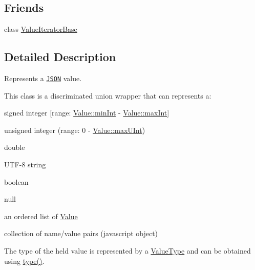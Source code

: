 \subsection*{Friends}
\begin{DoxyCompactItemize}
\item 
class \hyperlink{classJson_1_1Value_ad016df56489e5d360735457afba2f649_ad016df56489e5d360735457afba2f649}{Value\+Iterator\+Base}
\end{DoxyCompactItemize}


\subsection{Detailed Description}
Represents a \href{http://www.json.org}{\tt J\+S\+ON} value. 

This class is a discriminated union wrapper that can represents a\+:
\begin{DoxyItemize}
\item signed integer \mbox{[}range\+: \hyperlink{classJson_1_1Value_a7df8a39e2502b8c92a6a41e3d752d2c8_a7df8a39e2502b8c92a6a41e3d752d2c8}{Value\+::min\+Int} -\/ \hyperlink{classJson_1_1Value_a978c799a8af3114ef7dab6fd0a310a1b_a978c799a8af3114ef7dab6fd0a310a1b}{Value\+::max\+Int}\mbox{]}
\item unsigned integer (range\+: 0 -\/ \hyperlink{classJson_1_1Value_ac79e63ee68d3aa914bfd6988be669b87_ac79e63ee68d3aa914bfd6988be669b87}{Value\+::max\+U\+Int})
\item double
\item U\+T\+F-\/8 string
\item boolean
\item \textquotesingle{}null\textquotesingle{}
\item an ordered list of \hyperlink{classJson_1_1Value}{Value}
\item collection of name/value pairs (javascript object)
\end{DoxyItemize}

The type of the held value is represented by a \hyperlink{namespaceJson_a7d654b75c16a57007925868e38212b4e_a7d654b75c16a57007925868e38212b4e}{Value\+Type} and can be obtained using \hyperlink{classJson_1_1Value_a8ce61157a011894f0252ceed232312de_a8ce61157a011894f0252ceed232312de}{type()}.

